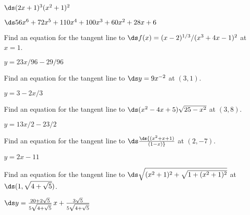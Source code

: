 \begin{exercises}
\begin{exercise} $\ds (2x+1)^3(x^2+1)^2$
\begin{answer} $\ds 56x^6+72x^5+110x^4+100x^3+60x^2+28x+6$
\end{answer}\end{exercise}

\endtwocol
\bsk

\begin{exercise}  Find an equation for the tangent line to 
$\ds f(x) = (x-2)^{1/3}/(x^3 + 4x - 1)^2$ at $x=1$.
\begin{answer} $y=23x/96-29/96$
\end{answer}\end{exercise}

\begin{exercise} Find an equation for the tangent line to $\ds y=9x^{-2}$ at $(3,1)$.
\begin{answer} $y=3-2x/3$
\end{answer}\end{exercise}

\begin{exercise} Find an equation for the tangent line to $\ds (x^2-4x+5)\sqrt{25-x^2}$ 
at $(3,8)$.
\begin{answer} $y=13x/2-23/2$
\end{answer}\end{exercise}

\begin{exercise} Find an equation for the tangent line to $\ds \ds{(x^2+x+1)\over(1-x)}$ 
at $(2,-7)$.
\begin{answer} $y=2x-11$
\end{answer}\end{exercise}

\begin{exercise} Find an equation for the tangent line to 
$\ds \sqrt{(x^2+1)^2+\sqrt{1+(x^2+1)^2}}$
at $\ds (1,\sqrt{4+\sqrt{5}})$.
\begin{answer} $\ds y=
{20+2\sqrt5\over5\sqrt{4+\sqrt5}}\,x+{3\sqrt5\over5\sqrt{4+\sqrt5}}$
\end{answer}\end{exercise}

\end{exercises}
